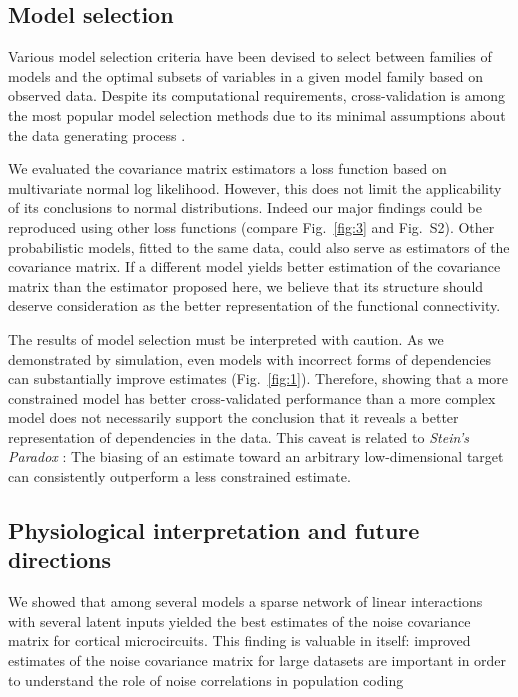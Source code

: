 \subsection{Model selection}
Various model selection criteria have been devised to select between families of models and the optimal subsets of variables in a given model family based on observed data. Despite its computational requirements, cross-validation is among the most popular model selection methods due to its minimal assumptions about the data generating process \citep{Arlot:2010}.

We evaluated the covariance matrix estimators a loss function based on multivariate normal log likelihood.  However, this does not limit the applicability of its conclusions to normal distributions. Indeed our major findings could be reproduced using other loss functions (compare Fig.~\ref{fig:3} and Fig.~S2).  Other probabilistic models, fitted to the same data, could also serve as estimators of the covariance matrix.  If a different model yields better estimation of the covariance matrix than the estimator proposed here, we believe that its structure should deserve consideration as the better representation of the functional connectivity.

The results of model selection must be interpreted with caution.  As we demonstrated by simulation, even models with incorrect forms of dependencies can substantially improve estimates (Fig.~\ref{fig:1}). Therefore, showing that a more constrained model has better cross-validated performance than a more complex model does not necessarily support the conclusion that it reveals a better representation of dependencies in the data.  This caveat is related to \emph{Stein's Paradox} \citep{Efron:1977}: The biasing of an estimate toward an arbitrary low-dimensional target can consistently outperform a less constrained estimate.

\subsection{Physiological interpretation and future directions}

We showed that among several models a sparse network of linear interactions with several latent inputs yielded the best estimates of the noise covariance matrix for cortical microcircuits.  This finding is valuable in itself: improved estimates of the noise covariance matrix for large datasets are important in order to understand the role of noise correlations in population coding \citep{Abbott:1999, Sompolinsky:2001, Averbeck:2006, Ecker:2011}

